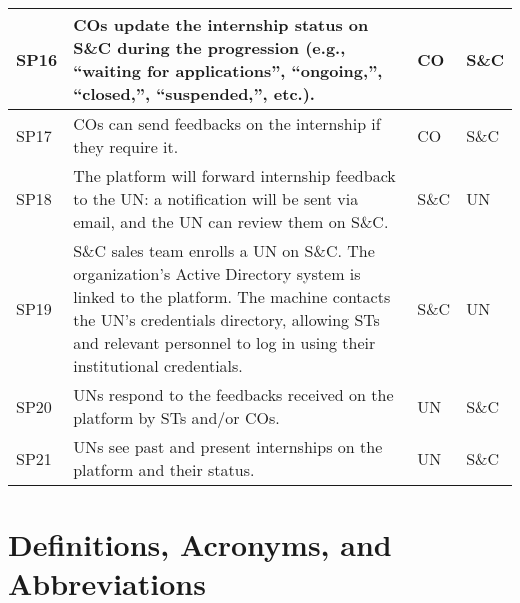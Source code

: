 \begin{longtable}{|l|p{}|l|l|}
    \hline
    SP16               & COs update the internship status on S\&C during the progression (e.g., “waiting for applications”, “ongoing,”, “closed,”, “suspended,”, etc.).                                                                                                        & CO         & S\&C     \\
    \hline
    SP17               & COs can send feedbacks on the internship if they require it.                                                                                                                                                                                          & CO         & S\&C     \\
    \hline
    SP18               & The platform will forward internship feedback to the UN: a notification will be sent via email, and the UN can review them on S\&C.                                                                                                                   & S\&C       & UN       \\
    \hline
    SP19               & S\&C sales team enrolls a UN on S\&C. The organization's Active Directory system is linked to the platform. The machine contacts the UN's credentials directory, allowing STs and relevant personnel to log in using their institutional credentials. & S\&C       & UN       \\
    \hline
    SP20               & UNs respond to the feedbacks received on the platform by STs and/or COs.                                                                                                                                                                              & UN         & S\&C     \\
    \hline
    SP21               & UNs see past and present internships on the platform and their status.                                                                                                                                                                                & UN         & S\&C     \\
    \hline
\end{longtable}

\section{Definitions, Acronyms, and Abbreviations}
\label{sec:definitions-acronyms-abbreviations}%

